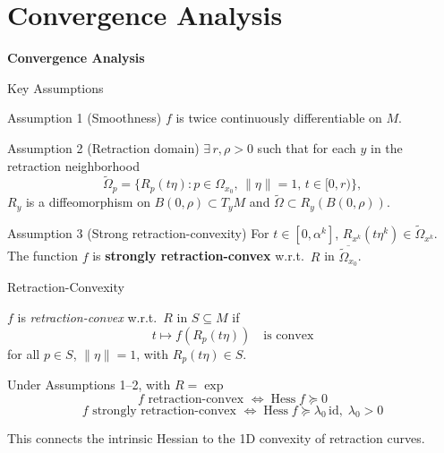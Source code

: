 \documentclass[10pt,aspectratio=169]{beamer}
\DeclareMathOperator{\hess}{Hess}
\begin{document}
\section{Convergence Analysis}

\begin{frame}{}
\centering
\vfill
{\Huge\bfseries Convergence Analysis}
\vfill
\end{frame}

\begin{frame}{Key Assumptions}
\begin{block}{Assumption 1 (Smoothness)}
$f$ is twice continuously differentiable on $M$.
\end{block}

\begin{block}{Assumption 2 (Retraction domain)}
$\exists\, r,\rho>0$ such that for each $y$ in the retraction neighborhood
$$\widetilde{\Omega}_p = \{R_p(t\eta): p\in\Omega_{x_0},\,\|\eta\|=1,\,t\in[0,r)\},$$
$R_y$ is a diffeomorphism on $B(0,\rho)\subset T_yM$ and $\widetilde{\Omega}\subset R_y(B(0,\rho))$.
\end{block}

\begin{block}{Assumption 3 (Strong retraction-convexity)}
For $t\in[0,\alpha^k]$, $R_{x^k}(t\eta^k)\in\widetilde{\Omega}_{x^k}$. The function $f$ is \textbf{strongly retraction-convex} w.r.t.\ $R$ in $\overline{\widetilde{\Omega}_{x_0}}$.
\end{block}
\end{frame}

\begin{frame}{Retraction-Convexity}
\begin{definition}
$f$ is \emph{retraction-convex} w.r.t.\ $R$ in $S\subseteq M$ if
$$t\mapsto f(R_p(t\eta)) \quad\text{is convex}$$
for all $p\in S$, $\|\eta\|=1$, with $R_p(t\eta)\in S$.
\end{definition}

\begin{lemma}
Under Assumptions 1--2, with $R=\exp$
$$f \text{ retraction-convex } \iff \hess f \succeq 0$$
$$f \text{ strongly retraction-convex } \iff \hess f \succeq \lambda_0\,\mathrm{id},\; \lambda_0>0$$
\end{lemma}
This connects the intrinsic Hessian to the 1D convexity of retraction curves.
\end{frame}
\end{document}
